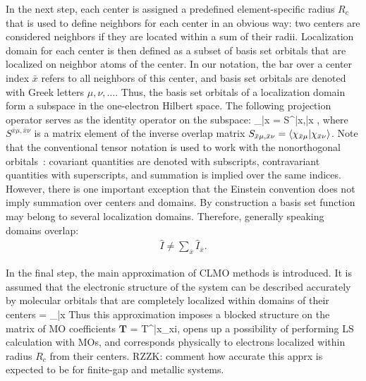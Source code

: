 \documentclass[aps,prl,twocolumn,reprint,amsmath,amssymb]{revtex4-1}
\begin{document}
In the next step, each center is assigned a predefined element-specific radius $R_c$ that is used to define neighbors for each center in an obvious way: two centers are considered neighbors if they are located within a sum of their radii. Localization domain for each center is then defined as a subset of basis set orbitals  that are localized on neighbor atoms of the center. In our notation, the bar over a center index $\bar{x}$ refers to all neighbors of this center, and basis set orbitals are denoted with Greek letters $\mu,\nu,\ldots$. Thus, the basis set orbitals of a localization domain form a subspace in the one-electron Hilbert space. The following projection operator serves as the identity operator on the subspace:
%
\bea
{}_{\bar{x}} =  S^{\bar{x}\mu,\bar{x}\nu} ,
\eea
%
where $S^{\bar{x}\mu,\bar{x}\nu}$ is a matrix element of the inverse overlap matrix $S_{\bar{x}\mu,\bar{x}\nu} = \langle  \chi_{\bar{x}\mu} \vert  \chi_{\bar{x}\nu} \rangle $. Note that the conventional tensor notation is used to work with the nonorthogonal orbitals~\cite{RZZK-tensor}: covariant quantities are denoted with subscripts, contravariant quantities with superscripts, and summation is implied over the same indices. However, there is one important exception that the Einstein convention does not imply summation over centers and domains. 
%
By construction a basis set function may belong to several localization domains. Therefore, generally speaking domains overlap:
%
\begin{eqnarray}
\label{eq:span}
\hat{I} \neq \sum_{\bar{x}} \hat{I}_{\bar{x}}.
\end{eqnarray}

In the final step, the main approximation of CLMO methods is introduced. It is assumed that the electronic structure of the system can be described accurately by molecular orbitals that are completely localized within domains of their centers
%
\bea
{} = _{\bar{x}} 
\label{eq:LMO}
\eea
%
Thus this approximation imposes a blocked structure on the matrix of MO coefficients $\mathbf{T}$
%
\bea
{} =  {T^{\bar{x}\mu}}_{xi},
\label{eq:LMO}
\eea
%
opens up a possibility of performing LS calculation with MOs, and corresponds physically to electrons localized within radius $R_c$ from their centers. RZZK: comment how accurate this apprx is expected to be for finite-gap and metallic systems.

\end{document}

